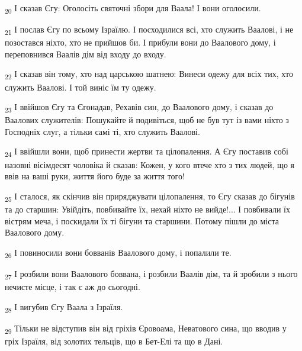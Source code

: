 \begin{tcolorbox}
\textsubscript{20} І сказав Єгу: Оголосіть святочні збори для Ваала! І вони оголосили.
\end{tcolorbox}
\begin{tcolorbox}
\textsubscript{21} І послав Єгу по всьому Ізраїлю. І посходилися всі, хто служить Ваалові, і не позостався ніхто, хто не прийшов би. І прибули вони до Ваалового дому, і переповнився Ваалів дім від входу до входу.
\end{tcolorbox}
\begin{tcolorbox}
\textsubscript{22} І сказав він тому, хто над царською шатнею: Винеси одежу для всіх тих, хто служить Ваалові. І той виніс їм ту одежу.
\end{tcolorbox}
\begin{tcolorbox}
\textsubscript{23} І ввійшов Єгу та Єгонадав, Рехавів син, до Ваалового дому, і сказав до Ваалових служителів: Пошукайте й подивіться, щоб не був тут із вами ніхто з Господніх слуг, а тільки самі ті, хто служить Ваалові.
\end{tcolorbox}
\begin{tcolorbox}
\textsubscript{24} І ввійшли вони, щоб принести жертви та цілопалення. А Єгу поставив собі назовні вісімдесят чоловіка й сказав: Кожен, у кого втече хто з тих людей, що я ввів на ваші руки, життя його буде за життя того!
\end{tcolorbox}
\begin{tcolorbox}
\textsubscript{25} І сталося, як скінчив він приряджувати цілопалення, то Єгу сказав до бігунів та до старшин: Увійдіть, повбивайте їх, нехай ніхто не вийде!... І повбивали їх вістрям меча, і поскидали їх ті бігуни та старшини. Потому пішли до міста Ваалового дому.
\end{tcolorbox}
\begin{tcolorbox}
\textsubscript{26} І повиносили вони бовванів Ваалового дому, і попалили те.
\end{tcolorbox}
\begin{tcolorbox}
\textsubscript{27} І розбили вони Ваалового боввана, і розбили Ваалів дім, та й зробили з нього нечисте місце, і так є аж до сьогодні.
\end{tcolorbox}
\begin{tcolorbox}
\textsubscript{28} І вигубив Єгу Ваала з Ізраїля.
\end{tcolorbox}
\begin{tcolorbox}
\textsubscript{29} Тільки не відступив він від гріхів Єровоама, Неватового сина, що вводив у гріх Ізраїля, від золотих тельців, що в Бет-Елі та що в Дані.
\end{tcolorbox}

